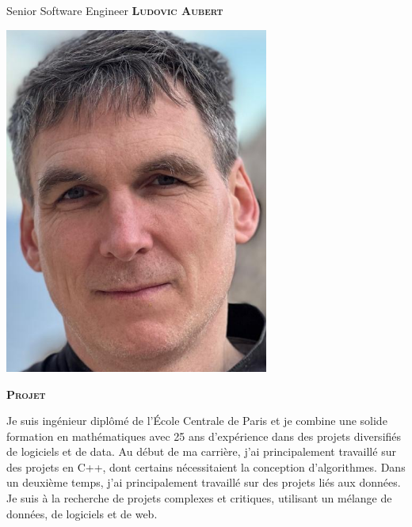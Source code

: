 \documentclass[11pt, a4paper]{article}
\newcommand{\headleft}[1]{\vspace*{3ex}\textsc{\textbf{#1}}\par%
    \vspace*{-1.5ex}\hrulefill\par\vspace*{0.7ex}}
\begin{document}
\setlength{\topskip}{0pt}
\setlength{\parindent}{0pt}
\setlength{\parskip}{0pt}
\setlength{\fboxsep}{0pt}
\pagestyle{empty}
\raggedbottom

\begin{minipage}[t]{0.33\textwidth} %
\colorbox{cvblue}{\begin{minipage}[t][5mm][t]{\textwidth}\null\hfill\null\end{minipage}}

\vspace{-.2ex} %
\colorbox{cvblue!90}{\color{white}  %
\textwidth\relax%
\begin{minipage}[t][293mm][t]{0.82\textwidth}
\raggedright
\vspace*{2.5ex}

\Large Senior Software Engineer \textbf{\textsc{Ludovic Aubert}} \normalsize 

\null\hfill\includegraphics[width=0.65\textwidth]{lax.png}\hfill\null

\vspace*{0.5ex} %

\headleft{Projet}
Je suis ingénieur diplômé de l'École Centrale de Paris et je combine une solide formation en mathématiques avec 25 ans d'expérience dans des projets diversifiés de logiciels et de data. Au début de ma carrière, j'ai principalement travaillé sur des projets en C++, dont certains nécessitaient la conception d'algorithmes. Dans un deuxième temps, j'ai principalement travaillé sur des projets liés aux données. Je suis à la recherche de projets complexes et critiques, utilisant un mélange de données, de logiciels et de web.


\end{minipage}}
\end{minipage}
\end{document}
